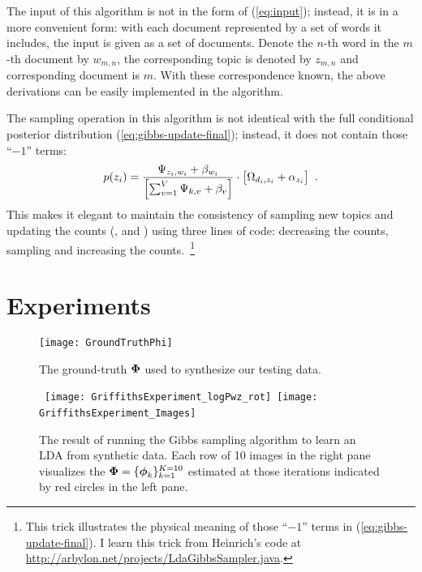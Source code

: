 The input of this algorithm is not in the form of (\ref{eq:input});
instead, it is in a more convenient form: with each document
represented by a set of words it includes, the input is given as a set
of documents.  Denote the $n$-th word in the $m$-th document by
$w_{m,n}$, the corresponding topic is denoted by $z_{m,n}$ and
corresponding document is $m$.  With these correspondence known, the
above derivations can be easily implemented in the algorithm.

The sampling operation in this algorithm is not identical with the
full conditional posterior distribution (\ref{eq:gibbs-update-final});
instead, it does not contain those ``$-1$'' terms:
\begin{equation}
  \label{eq:gibbs-update-real}
  \begin{split}
    p(z_i)
    =
    \frac{
      \Psi_{z_i,w_i} + \beta_{w_i}
    }{
      \left[ \sum_{v=1}^{V}  \Psi_{k,v} + \beta_{v} \right]
    }
    \cdot
    \big[
      \Omega_{d_i,z_i} + \alpha_{z_i}
    \big]
    \enspace.
  \end{split}
\end{equation}
This makes it elegant to maintain the consistency of sampling new
topics and updating the counts (,  and )
using three lines of code: decreasing the counts, sampling and
increasing the counts.~\footnote{This trick illustrates the physical
  meaning of those ``$-1$'' terms in (\ref{eq:gibbs-update-final}).  I
  learn this trick from Heinrich's code at
  \url{http://arbylon.net/projects/LdaGibbsSampler.java}.}


\section{Experiments}

\begin{figure}[!t]
  \centering
  \texttt{[image: GroundTruthPhi]}
  \caption{The ground-truth $\boldsymbol{\Phi}$ used to synthesize our testing data.}
  \label{fig:ground-truth-Phi}
\end{figure}



\begin{figure}[!t]
  \centering
  \mbox{
  \texttt{[image: GriffithsExperiment\_logPwz\_rot]}
  \hspace{-0.5cm}
  \texttt{[image: GriffithsExperiment\_Images]}
}
\caption{The result of running the Gibbs sampling algorithm to learn
  an LDA from synthetic data.  Each row of 10 images in the right pane
  visualizes the $\boldsymbol{\Phi}=\{\boldsymbol{\phi}_{k}\}_{k=1}^{K=10}$ estimated at
  those iterations indicated by red circles in the left pane.}
  \label{fig:correctness-test}
\end{figure}

